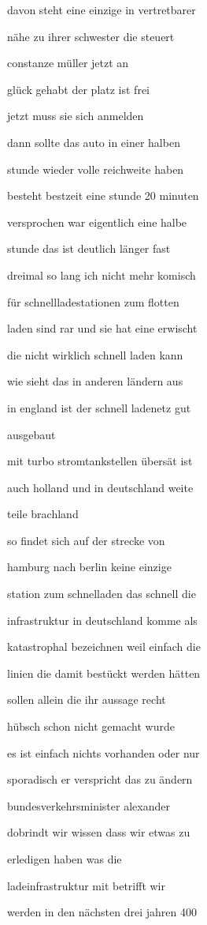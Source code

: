 \documentclass[a4paper, 11pt]{book} %
\begin{document}
davon steht eine einzige in vertretbarer

nähe zu ihrer schwester die steuert

constanze müller jetzt an

glück gehabt der platz ist frei

jetzt muss sie sich anmelden

dann sollte das auto in einer halben

stunde wieder volle reichweite haben

besteht bestzeit eine stunde 20 minuten

versprochen war eigentlich eine halbe

stunde das ist deutlich länger fast

dreimal so lang ich nicht mehr komisch

für schnellladestationen zum flotten

laden sind rar und sie hat eine erwischt

die nicht wirklich schnell laden kann

wie sieht das in anderen ländern aus

in england ist der schnell ladenetz gut

ausgebaut

mit turbo stromtankstellen übersät ist

auch holland und in deutschland weite

teile brachland

so findet sich auf der strecke von

hamburg nach berlin keine einzige

station zum schnelladen das schnell die

infrastruktur in deutschland komme als

katastrophal bezeichnen weil einfach die

linien die damit bestückt werden hätten

sollen allein die ihr aussage recht

hübsch schon nicht gemacht wurde

es ist einfach nichts vorhanden oder nur

sporadisch er verspricht das zu ändern

bundesverkehrsminister alexander

dobrindt wir wissen dass wir etwas zu

erledigen haben was die

ladeinfrastruktur mit betrifft wir

werden in den nächsten drei jahren 400
\end{document}
